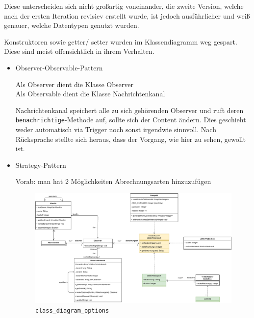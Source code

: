 \documentclass{article}
\newcommand{\gqq}[1]{\glqq{}#1\grqq{}}
\begin{document}
\begin{enumerate}[label=\alph*.]
            Diese unterscheiden sich nicht großartig voneinander, die zweite Version, welche nach der ersten Iteration revisiev erstellt wurde, ist jedoch ausführlicher und weiß genauer, welche Datentypen genutzt wurden.

            Konstruktoren sowie getter/ setter wurden im Klassendiagramm weg gespart.
            Diese sind meist offensichtlich in ihrem Verhalten.

            \begin{itemize}
                \item Observer-Observable-Pattern
                    
                    Als Observer dient die Klasse \gqq{Observer}\\
                    Als Observable dient die Klasse \gqq{Nachrichtenkanal}

                    Nachrichtenkanal speichert alle zu sich gehörenden Observer und ruft deren \texttt{benachrichtige}-Methode auf, sollte sich der Content ändern.
                    Dies geschieht weder automatisch via Trigger noch sonst irgendwie sinnvoll.
                    Nach Rücksprache stellte sich heraus, dass der Vorgang, wie hier zu sehen, gewollt ist.
                \newpage
                \item Strategy-Pattern
                
                    Vorab: man hat 2 Möglichkeiten Abrechnungsarten hinzuzufügen
                
                    \begin{figure}[ht]
                        \includegraphics[width=\textwidth]{swt_wende_tim_h08_class_diagram_options.pdf}
                        \caption{\texttt{class\_diagram\_options}}
                    \end{figure}
                

\end{itemize}
\end{enumerate}
\end{document}
